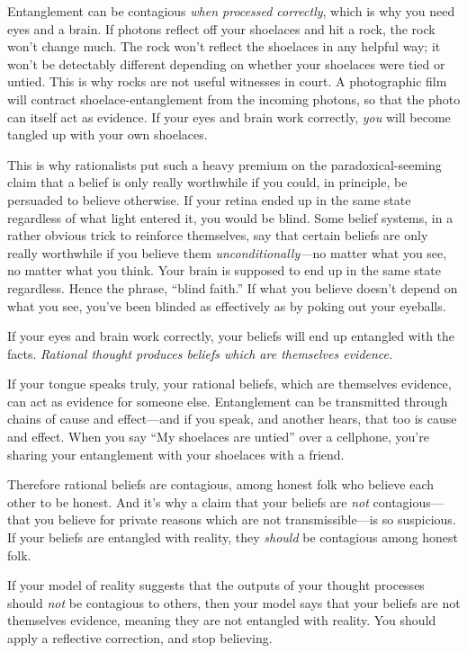 {
 Entanglement can be contagious \textit{when processed correctly},
which is why you need eyes and a brain. If photons reflect off your
shoelaces and hit a rock, the rock won't change much.
The rock won't reflect the shoelaces in any helpful
way; it won't be detectably different depending on
whether your shoelaces were tied or untied. This is why rocks are not
useful witnesses in court. A photographic film will contract
shoelace-entanglement from the incoming photons, so that the photo can
itself act as evidence. If your eyes and brain work correctly,
\textit{you} will become tangled up with your own shoelaces.}

{
 This is why rationalists put such a heavy premium on the
paradoxical-seeming claim that a belief is only really worthwhile if
you could, in principle, be persuaded to believe otherwise. If your
retina ended up in the same state regardless of what light entered it,
you would be blind. Some belief systems, in a rather obvious trick to
reinforce themselves, say that certain beliefs are only really
worthwhile if you believe them \textit{unconditionally---}no matter
what you see, no matter what you think. Your brain is supposed to end
up in the same state regardless. Hence the phrase,
``blind faith.'' If what you believe
doesn't depend on what you see, you've
been blinded as effectively as by poking out your eyeballs.}

{
 If your eyes and brain work correctly, your beliefs will end up
entangled with the facts. \textit{Rational thought produces beliefs
which are themselves evidence.}}

{
 If your tongue speaks truly, your rational beliefs, which are
themselves evidence, can act as evidence for someone else. Entanglement
can be transmitted through chains of cause and effect---and if you
speak, and another hears, that too is cause and effect. When you say
``My shoelaces are untied'' over a
cellphone, you're sharing your entanglement with your
shoelaces with a friend.}

{
 Therefore rational beliefs are contagious, among honest folk who
believe each other to be honest. And it's why a claim
that your beliefs are \textit{not} contagious---that you believe for
private reasons which are not transmissible---is so suspicious. If your
beliefs are entangled with reality, they \textit{should} be contagious
among honest folk.}

{
 If your model of reality suggests that the outputs of your thought
processes should \textit{not} be contagious to others, then your model
says that your beliefs are not themselves evidence, meaning they are
not entangled with reality. You should apply a reflective correction,
and stop believing.}

